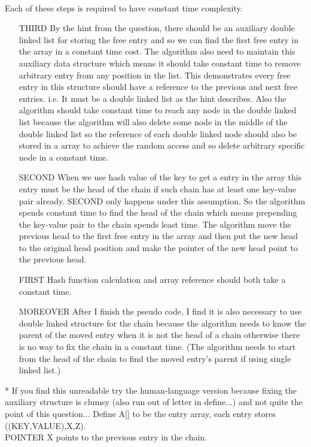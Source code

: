 \documentclass[10pt,twoside,a4paper]{article}
\begin{document}
\begin{itemize}
\\Each of these steps is required to have constant time complexity.
\begin{itemize}
\item[THIRD]
By the hint from the question, there should be an auxiliary double linked list for storing the free  entry and so we can find the first free entry in the array in a constant time cost. The algorithm also need to maintain this auxiliary data structure which means it should take constant time to remove arbitrary entry from any position in the list. This demonstrates every free entry in this structure should have a reference to the previous and next free entries. i.e. It must be a double linked list as the hint describes. Also the algorithm should take constant time to reach any node in the double linked list because the algorithm will also delete some node in the middle of the double linked list so the reference of each double linked node should also be stored in a array to achieve the random access and so delete arbitrary specific node in a constant time.
\item[SECOND]
When we use hash value of the key to get a entry in the array this entry must be the head of the chain if such chain has at least one key-value pair already. SECOND only happens under this assumption. So the algorithm spends constant time to find the head of the chain which means  prepending the key-value pair to the chain spends least time. The algorithm move the previous head to the first free entry in the array and then put the new head to the original head position and make the pointer of the new head point to the previous head.
\item[FIRST]
Hash function calculation and array reference should both take a constant time.
\item[MOREOVER] After I finish the pseudo code, I find it is also necessary to use double linked structure for the chain because the algorithm needs to know the parent of the moved entry when it is not the head of a chain otherwise there is no way to fix the chain in a constant time. (The algorithm needs to start from the head of the chain to find the moved entry's parent if using single linked list.)
\end{itemize}
* If you find this unreadable try the human-language version because fixing the auxiliary structure is clumsy (also run out of letter in define...) and not quite the point of this question...
Define A[] to be the entry array, each entry stores ((KEY,VALUE),X,Z).
\\POINTER X points to the previous entry in the chain.

\end{itemize}
\end{document}
